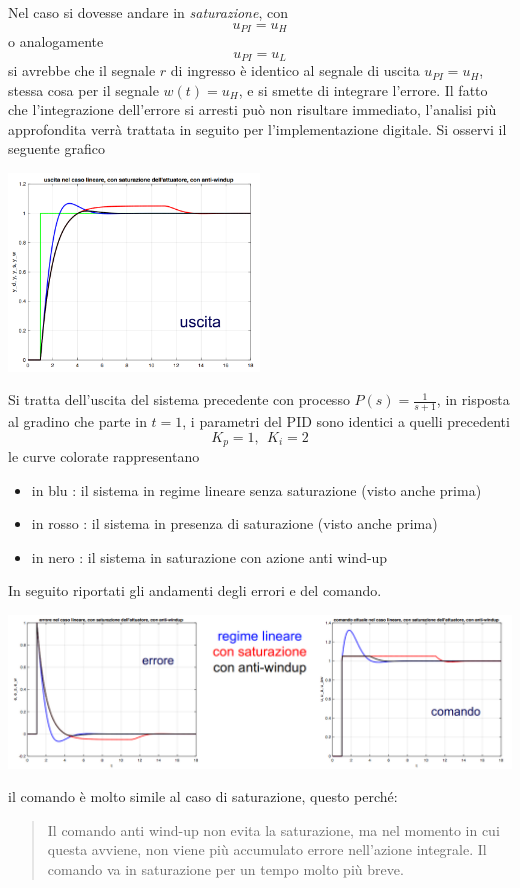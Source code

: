 \documentclass[10pt, letterpaper]{report}
\begin{document}
Nel caso si dovesse andare in \textit{saturazione}, con  $$u_{PI}=u_H$$ o analogamente 
$$ u_{PI}=u_L$$
si avrebbe che il segnale $r$ di ingresso è identico al segnale di uscita $u_{PI}=u_H$, stessa cosa per il segnale $w(t)=u_H$, e si smette di integrare l'errore. Il fatto che l'integrazione dell'errore si arresti può non risultare immediato, l'analisi più approfondita verrà trattata in seguito per l'implementazione digitale.\acc 
Si osservi il seguente grafico\begin{center}
    \includegraphics[width=0.5\textwidth]{images/antiWindUp2.png}
\end{center}
Si tratta dell'uscita del sistema precedente con processo $P(s)=\frac{1}{s+1}$, in risposta al gradino che parte in $t=1$, i parametri del PID sono identici a quelli precedenti $$ K_p=1, \ \ K_i=2$$ le curve colorate rappresentano\begin{itemize}
    \item in blu : il sistema in regime lineare senza saturazione (visto anche prima)
    \item in rosso : il sistema in presenza di saturazione (visto anche prima)
    \item in nero : il sistema in saturazione con azione anti wind-up
\end{itemize}
In seguito riportati gli andamenti degli errori e del comando.
\begin{center}
    \includegraphics[width=1\textwidth]{images/antiWindUp3.png}
\end{center}
il comando è molto simile al caso di saturazione, questo perché:\begin{quote}
    Il comando anti wind-up non evita la saturazione, ma nel momento in cui questa avviene, non viene più accumulato errore nell'azione integrale. Il comando va in saturazione per un tempo molto più breve.
\end{quote}
\end{document}
